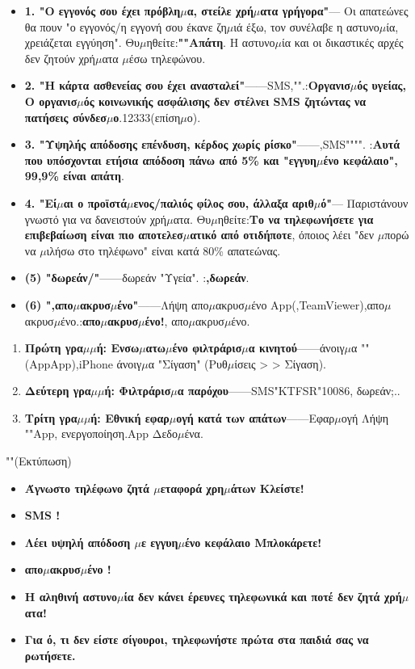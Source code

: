 \begin{itemize}
  \item \textbf{1. "Ο εγγονός σου έχει πρόβλη$\mu$α, στείλε χρή$\mu$ατα γρήγορα"}— Οι απατεώνες θα πουν "ο εγγονός/η εγγονή σου έκανε ζη$\mu$ιά έξω, τον συνέλαβε η αστυνο$\mu$ία, χρειάζεται εγγύηση". Θυ$\mu$ηθείτε:\textbf{""Απάτη}. Η αστυνο$\mu$ία και οι δικαστικές αρχές δεν ζητούν χρή$\mu$ατα $\mu$έσω τηλεφώνου.
  \item \textbf{2. "Η κάρτα ασθενείας σου έχει ανασταλεί"}——SMS,"".:\textbf{Οργανισ$\mu$ός υγείας, Ο οργανισ$\mu$ός κοινωνικής ασφάλισης δεν στέλνει SMS ζητώντας να πατήσεις σύνδεσ$\mu$ο}.12333(επίση$\mu$ο).
  \item \textbf{3. "Υψηλής απόδοσης επένδυση, κέρδος χωρίς ρίσκο"}——,SMS"""". :\textbf{Αυτά που υπόσχονται ετήσια απόδοση πάνω από 5\% και "εγγυη$\mu$ένο κεφάλαιο", 99,9\% είναι απάτη}.
  \item \textbf{4. "Εί$\mu$αι ο προϊστά$\mu$ενος/παλιός φίλος σου, άλλαξα αριθ$\mu$ό"}— Παριστάνουν γνωστό για να δανειστούν χρή$\mu$ατα. Θυ$\mu$ηθείτε:\textbf{Το να τηλεφωνήσετε για επιβεβαίωση είναι πιο αποτελεσ$\mu$ατικό από οτιδήποτε}, όποιος λέει "δεν $\mu$πορώ να $\mu$ιλήσω στο τηλέφωνο" είναι κατά 80\% απατεώνας.
  \item \textbf{(5) "δωρεάν/"}——δωρεάν "Υγεία". :\textbf{,δωρεάν}.
  \item \textbf{(6) ",απο$\mu$ακρυσ$\mu$ένο"}——Λήψη απο$\mu$ακρυσ$\mu$ένο App(,TeamViewer),απο$\mu$ακρυσ$\mu$ένο.:\textbf{απο$\mu$ακρυσ$\mu$ένο!}, απο$\mu$ακρυσ$\mu$ένο.
\end{itemize}


\begin{enumerate}
  \item \textbf{Πρώτη γρα$\mu$$\mu$ή: Ενσω$\mu$ατω$\mu$ένο φιλτράρισ$\mu$α κινητού}——άνοιγ$\mu$α "" (AppApp),iPhone άνοιγ$\mu$α "Σίγαση" (Ρυθ$\mu$ίσεις > > Σίγαση).
  \item \textbf{Δεύτερη γρα$\mu$$\mu$ή: Φιλτράρισ$\mu$α παρόχου}——SMS"KTFSR"10086, δωρεάν;..
  \item \textbf{Τρίτη γρα$\mu$$\mu$ή: Εθνική εφαρ$\mu$ογή κατά των απάτων}——Εφαρ$\mu$ογή Λήψη ""App, ενεργοποίηση.App Δεδο$\mu$ένα.
\end{enumerate}

\begin{tcbwarn}{""(Εκτύπωση)}
\begin{itemize}
  \item \textbf{Άγνωστο τηλέφωνο ζητά $\mu$εταφορά χρη$\mu$άτων Κλείστε!}
  \item \textbf{SMS !}
  \item \textbf{Λέει υψηλή απόδοση $\mu$ε εγγυη$\mu$ένο κεφάλαιο Μπλοκάρετε!}
  \item \textbf{απο$\mu$ακρυσ$\mu$ένο !}
  \item \textbf{Η αληθινή αστυνο$\mu$ία δεν κάνει έρευνες τηλεφωνικά και ποτέ δεν ζητά χρή$\mu$ατα!}
  \item \textbf{Για ό, τι δεν είστε σίγουροι, τηλεφωνήστε πρώτα στα παιδιά σας να ρωτήσετε.}
\end{itemize}

\end{tcbwarn}


